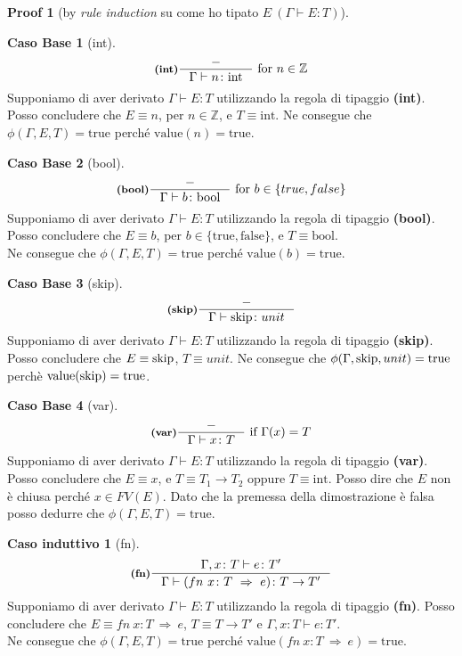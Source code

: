 \documentclass[a4paper, 10pt]{article}
\newcommand{\numberset}{\mathbb}
\newcommand{\Z}{\numberset{Z}}
\newcommand{\integer}{\textup{int}}
\newcommand{\bool}{\textup{bool}}
\newcommand{\skipp}{\textup{skip}}
\theoremstyle{definition}
\newtheorem{prf}{Proof}[]
\newtheorem{base}{Caso Base}
\newtheorem{ind}{Caso induttivo}
\newcommand{\infer}[4]{\inference[\textbf{#1}]{#2}{#3}#4 }
\begin{document}
\begin{multicols}{2}
\begin{prf}[by \textit{rule induction} su come ho tipato $ E\ (\Gamma \vdash E\colon T) $]
	\begin{base}[int]
		\[
			\infer{(int)}{-}{\Gamma \vdash n\colon \integer}{\ \textup{for}\ n \in \Z}
		\]
		Supponiamo di aver derivato $ \Gamma \vdash E\colon T $ utilizzando la regola di tipaggio \textbf{(int)}. Posso concludere che $ E\equiv n $, per $ n \in \Z $, e $ T\equiv \text{int} $. Ne consegue che $ \phi (\Gamma, E, T) = \text{true} $ perché $ \text{value}(n) = \text{true} $.
	\end{base}
	\begin{base}[bool]
		\[
		\infer{(bool)}{-}{\Gamma \vdash b\colon \bool}{\ \textup{for}\ b \in \{true, false\}}
		\]
		Supponiamo di aver derivato $ \Gamma \vdash E\colon T $ utilizzando la regola di tipaggio \textbf{(bool)}.\\ 
		Posso concludere che $ E\equiv b $, per $ b \in \{\text{true}, \text{false}\} $, e $ T\equiv \text{bool} $.\\ 
		Ne consegue che $ \phi (\Gamma, E, T) = \text{true} $ perché $ \text{value}(b) = \text{true} $.
	\end{base}
	\begin{base}[skip]
		\[
			\infer{(skip)}{-}{\Gamma\vdash \skipp\colon unit}{}
		\]
		Supponiamo di aver derivato $ \Gamma \vdash E\colon T $ utilizzando la regola di tipaggio \textbf{(skip)}. Posso concludere che $ E\equiv \skipp $, $ T\equiv unit $. Ne consegue che $ \phi (\Gamma, \skipp, unit) = \textup{true} $ perchè $ \text{value}(\skipp) = \text{true} $.
	\end{base}
	\begin{base}[var]
		\[
			\infer{(var)}{-}{\Gamma \vdash x \colon T}{\ \textup{if}\ \Gamma (x) = T} 
		\]
		Supponiamo di aver derivato $ \Gamma \vdash E\colon T $ utilizzando la regola di tipaggio \textbf{(var)}. Posso concludere che $ E\equiv x $, e $ T\equiv T_1\rightarrow T_2$ oppure $ T\equiv \text{int} $. Posso dire che $ E $ non è chiusa perché $ x \in FV(E) $. Dato che la premessa della dimostrazione è falsa posso dedurre che $ \phi (\Gamma, E, T) = \text{true} $.
	\end{base}
	\begin{ind}[fn]
		\[
			\infer{(fn)}{\Gamma , x \colon T \vdash e\colon T'}{\Gamma\vdash (fn\ x\colon T\ \Rightarrow\ e )\colon T\rightarrow T'}{}
		\]
		Supponiamo di aver derivato $ \Gamma \vdash E\colon T $ utilizzando la regola di tipaggio \textbf{(fn)}. Posso concludere che $ E\equiv fn\ x\colon T\ \Rightarrow\ e $, $ T\equiv T\rightarrow T' $ e $ \Gamma , x \colon T \vdash e\colon T' $.\\ Ne consegue che $ \phi (\Gamma, E, T) = \text{true} $ perché $ \text{value}(fn\ x\colon T\ \Rightarrow\ e) = \text{true} $.

\end{ind}
\end{prf}
\end{multicols}
\end{document}
